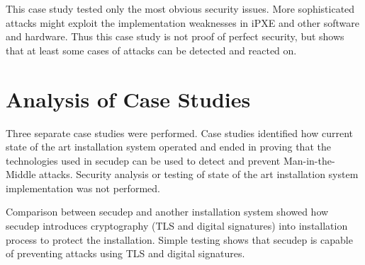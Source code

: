 This case study tested only the most obvious security issues. More
sophisticated attacks might exploit the implementation weaknesses in
iPXE and other software and hardware. Thus this case study is not
proof of perfect security, but shows that at least some cases of
attacks can be detected and reacted on.


\section{Analysis of Case Studies}

Three separate case studies were performed. Case studies identified
how current state of the art installation system operated and ended in
proving that the technologies used in secudep can be used to detect
and prevent Man-in-the-Middle attacks. Security analysis or testing of
state of the art installation system implementation was not performed.

Comparison between secudep and another installation system showed how
secudep introduces cryptography (TLS and digital signatures) into
installation process to protect the installation. Simple testing shows
that secudep is capable of preventing attacks using TLS and digital
signatures.
